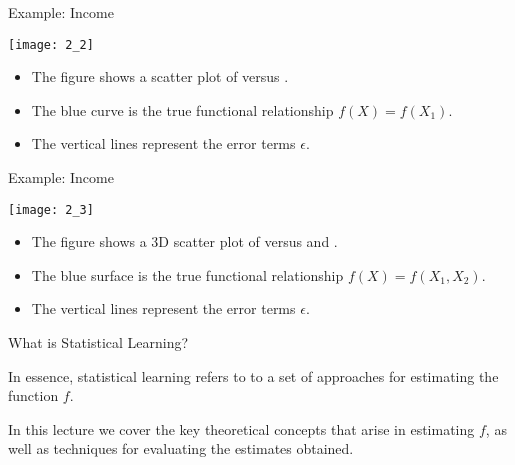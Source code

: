 \documentclass[mathserif, aspectratio=169]{beamer}
\begin{document}
\begin{frame}{Example: Income}
	\vspace{-5mm}
	\begin{center}
		\texttt{[image: 2\_2]}
	\end{center}
	\vspace{-5mm}
	\begin{itemize}
		\item The figure shows a scatter plot of  versus .
		\item The blue curve is the true functional relationship $f(X) =f(X_1)$.
		\item The vertical lines represent the error terms $\epsilon$.
	\end{itemize}
\end{frame}

\begin{frame}{Example: Income}
	\vspace{-5mm}
	\begin{center}
		\texttt{[image: 2\_3]}
	\end{center}
	\vspace{-5mm}
	\begin{itemize}
		\item The figure shows a 3D scatter plot of  versus 
			and .
		\item The blue surface is the true functional relationship $f(X) = f(X_1, X_2)$.
		\item The vertical lines represent the error terms $\epsilon$.
	\end{itemize}
\end{frame}

\begin{frame}{What is Statistical Learning?}
	\begin{blurb}
		In essence, statistical learning refers to to a set of approaches for estimating
		the function $f$.

		In this lecture we cover the key theoretical concepts that arise in estimating $f$, as well
		as techniques for evaluating the estimates obtained.
	\end{blurb}
\end{frame}
\end{document}
